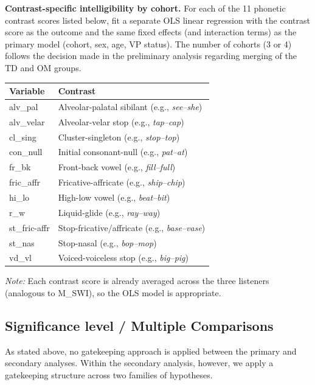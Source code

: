 \documentclass{article}
\begin{document}
\textbf{Contrast-specific intelligibility by cohort.} For each of the 11 phonetic contrast scores listed below, fit a separate OLS linear regression with the contrast score as the outcome and the same fixed effects (and interaction terms) as the primary model (cohort, sex, age, VP status). The number of cohorts (3 or 4) follows the decision made in the preliminary analysis regarding merging of the TD and OM groups.

    \begin{center}
    \begin{tabular}{ll}
    \toprule
    \textbf{Variable} & \textbf{Contrast} \\
    \midrule
    alv\_pal     & Alveolar-palatal sibilant (e.g., \textit{see--she}) \\
    alv\_velar   & Alveolar-velar stop (e.g., \textit{tap--cap}) \\
    cl\_sing     & Cluster-singleton (e.g., \textit{stop--top}) \\
    con\_null    & Initial consonant-null (e.g., \textit{pat--at}) \\
    fr\_bk       & Front-back vowel (e.g., \textit{fill--full}) \\
    fric\_affr   & Fricative-affricate (e.g., \textit{ship--chip}) \\
    hi\_lo       & High-low vowel (e.g., \textit{beat--bit}) \\
    r\_w         & Liquid-glide (e.g., \textit{ray--way}) \\
    st\_fric-affr & Stop-fricative/affricate (e.g., \textit{base--vase}) \\
    st\_nas      & Stop-nasal (e.g., \textit{bop--mop}) \\
    vd\_vl       & Voiced-voiceless stop (e.g., \textit{big--pig}) \\
    \bottomrule
    \end{tabular}
    \end{center}

    \textit{Note:} Each contrast score is already averaged across the three listeners 
    (analogous to M\_SWI), so the OLS model is appropriate. 


\subsection*{Significance level / Multiple Comparisons}\label{sec:secondary-significance}
As stated above, no gatekeeping approach is applied between the primary and 
secondary analyses. Within the secondary analysis, however, we apply a 
gatekeeping structure across two families of hypotheses. \\ 
\end{document}
